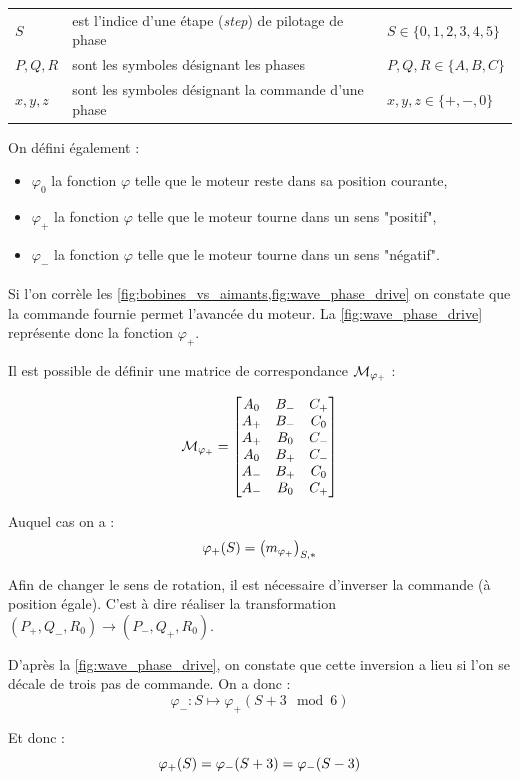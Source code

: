 \begin{tabular}{lll}
    $S$ & est l'indice d'une étape (\emph{step}) de pilotage de phase & $S \in \{0,1,2,3,4,5\}$ \\
    $P, Q, R$ & sont les symboles désignant les phases  & $P,Q,R \in \{A,B,C\}$ \\
    $x, y, z$ & sont les symboles désignant la commande d'une phase & $x, y, z \in \{+,-,0\}$
\end{tabular}
\newline
\newline
On défini également : 
\begin{itemize}
    \item $\varphi_0$ la fonction $\varphi$ telle que le moteur reste dans sa position courante,
    \item $\varphi_+$ la fonction $\varphi$ telle que le moteur tourne dans un sens "positif",
    \item $\varphi_-$ la fonction $\varphi$ telle que le moteur tourne dans un sens "négatif".
\end{itemize}

\paragraph{}

Si l'on corrèle les \cref{fig:bobines_vs_aimants,fig:wave_phase_drive} on constate que la commande fournie permet l'avancée du moteur.
La \cref{fig:wave_phase_drive} représente donc la fonction $\varphi_+$.

Il est possible de définir une matrice de correspondance $\mathcal{M}_{\varphi_{+}}$ :

\[
    \mathcal{M}_{\varphi_{+}} = 
    \begin{bmatrix}
        A_0 & B_- & C_+ \\
        A_+ & B_- & C_0 \\
        A_+ & B_0 & C_- \\
        A_0 & B_+ & C_- \\
        A_- & B_+ & C_0 \\
        A_- & B_0 & C_+ \\
    \end{bmatrix}
\]

Auquel cas on a :
$$\varphi_{+}(S) = \left(m_{\varphi_{+}}\right)_{S,*}$$

Afin de changer le sens de rotation, il est nécessaire d'inverser la commande (à position égale). C'est à dire réaliser la transformation  $(P_+,Q_-,R_0) \to (P_-,Q_+,R_0)$.

D'après la \cref{fig:wave_phase_drive}, on constate que cette inversion a lieu si l'on se décale de trois pas de commande. On a donc :
$$\varphi_- : S \longmapsto \varphi_+(S +3 \mod 6)$$

Et donc :
$$\varphi_{+}(S) = \varphi_{-}(S+3) = \varphi_{-}(S-3)$$